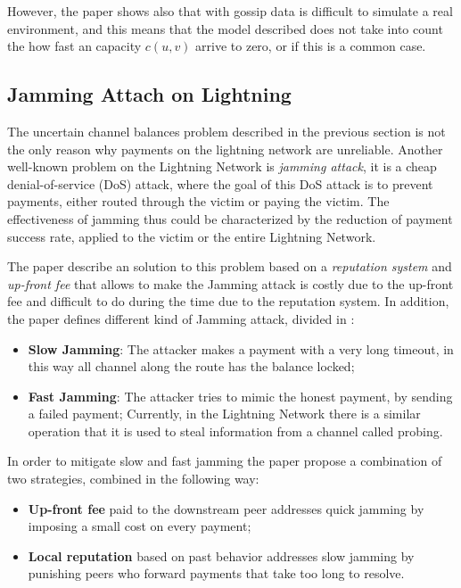 However, the paper shows also that with gossip data is difficult to simulate 
a real environment, and this means that the model described does not take into 
count the how fast an capacity $c(u, v)$ arrive to zero, or if this is a 
common case.

\subsection{Jamming Attach on Lightning}

The uncertain channel balances problem described in the previous section 
is not the only reason why payments on the lightning network are unreliable.
Another well-known problem on the Lightning Network is \emph{jamming attack},
it is a cheap denial-of-service (DoS) attack, where the goal of this DoS attack 
is to prevent payments, either routed through the victim or paying the victim. 
The effectiveness of jamming thus could be characterized by the reduction of 
payment success rate, applied to the victim or the entire Lightning Network.

The paper \cite{cryptoeprint:2022/1454} describe an solution to this problem 
based on a \emph{reputation system} and \emph{up-front fee} that allows to make
the Jamming attack is costly due to the up-front fee and difficult to do during the time 
due to the reputation system.
In addition, the paper defines different kind of Jamming attack, divided in :

\begin{itemize}
    \item {\bf Slow Jamming}: The attacker makes a payment with a very long timeout, 
        in this way all channel along the route has the balance locked;
    \item {\bf Fast Jamming}: The attacker tries to mimic the honest payment, by sending
        a failed payment; Currently, in the Lightning Network there is a similar operation
        that it is used to steal information from a channel called probing.
\end{itemize}

In order to mitigate slow and fast jamming the paper \cite{cryptoeprint:2022/1454}
propose a combination of two strategies, combined in the following way:

\begin{itemize}
    \item {\bf Up-front fee} paid to the downstream peer addresses quick jamming 
        by imposing a small cost on every payment;
    \item {\bf Local reputation} based on past behavior addresses slow jamming by 
        punishing peers who forward payments that take too long to resolve.
\end{itemize}

